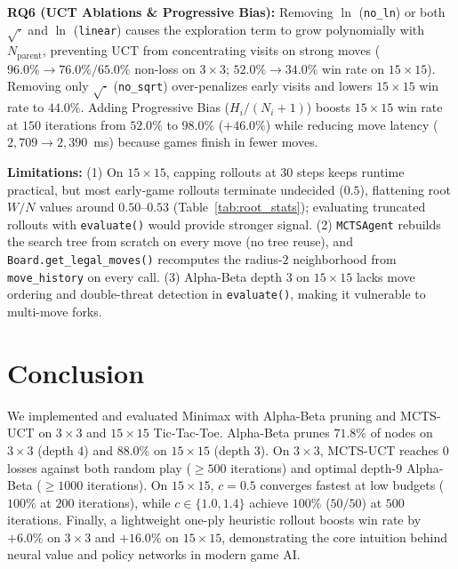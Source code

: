 \documentclass[conference]{IEEEtran}
\begin{document}
\textbf{RQ6 (UCT Ablations \& Progressive Bias):} Removing $\ln$ (\texttt{no\_ln}) or both $\sqrt{\cdot}$ and $\ln$ (\texttt{linear}) causes the exploration term to grow polynomially with $N_{\mathrm{parent}}$, preventing UCT from concentrating visits on strong moves ($96.0\% \rightarrow 76.0\% / 65.0\%$ non-loss on $3\times 3$; $52.0\% \rightarrow 34.0\%$ win rate on $15\times 15$). Removing only $\sqrt{\cdot}$ (\texttt{no\_sqrt}) over-penalizes early visits and lowers $15\times 15$ win rate to $44.0\%$. Adding Progressive Bias ($H_i/(N_i+1)$) boosts $15\times 15$ win rate at $150$ iterations from $52.0\%$ to $98.0\%$ ($+46.0\%$) while reducing move latency ($2{,}709 \rightarrow 2{,}390$~ms) because games finish in fewer moves.

\textbf{Limitations:} (1) On $15\times 15$, capping rollouts at $30$ steps keeps runtime practical, but most early-game rollouts terminate undecided ($0.5$), flattening root $W/N$ values around $0.50$--$0.53$ (Table~\ref{tab:root_stats}); evaluating truncated rollouts with \texttt{evaluate()} would provide stronger signal. (2) \texttt{MCTSAgent} rebuilds the search tree from scratch on every move (no tree reuse), and \texttt{Board.get\_legal\_moves()} recomputes the radius-$2$ neighborhood from \texttt{move\_history} on every call. (3) Alpha-Beta depth $3$ on $15\times 15$ lacks move ordering and double-threat detection in \texttt{evaluate()}, making it vulnerable to multi-move forks.

\section{Conclusion}
We implemented and evaluated Minimax with Alpha-Beta pruning and MCTS-UCT on $3\times 3$ and $15\times 15$ Tic-Tac-Toe. Alpha-Beta prunes $71.8\%$ of nodes on $3\times 3$ (depth $4$) and $88.0\%$ on $15\times 15$ (depth $3$). On $3\times 3$, MCTS-UCT reaches $0$ losses against both random play ($\ge 500$ iterations) and optimal depth-$9$ Alpha-Beta ($\ge 1000$ iterations). On $15\times 15$, $c = 0.5$ converges fastest at low budgets ($100\%$ at $200$ iterations), while $c \in \{1.0, 1.4\}$ achieve $100\%$ ($50/50$) at $500$ iterations. Finally, a lightweight one-ply heuristic rollout boosts win rate by $+6.0\%$ on $3\times 3$ and $+16.0\%$ on $15\times 15$, demonstrating the core intuition behind neural value and policy networks in modern game AI.
\end{document}
